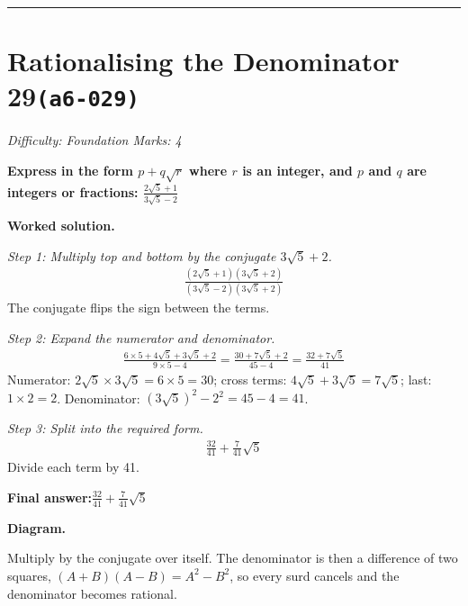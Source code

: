 \documentclass[11pt]{article}
\newcommand{\question}[1]{\par\medskip\noindent\textbf{#1}\par}
\begin{document}
\medskip\hrule

\section*{Rationalising the Denominator 29\quad\small\texttt{(a6-029)}}
\textit{Difficulty: Foundation \quad\textbar\quad Marks: 4}

\question{Express in the form \( p + q\sqrt{r} \) where \( r \) is an integer, and \( p \) and \( q \) are integers or fractions: \( \frac{2\sqrt{5} + 1}{3\sqrt{5} - 2} \)}

\textbf{Worked solution.}

\textit{Step 1: Multiply top and bottom by the conjugate \( 3\sqrt{5} + 2 \).}
\[\begin{gathered}
\frac{(2\sqrt{5} + 1)(3\sqrt{5} + 2)}{(3\sqrt{5} - 2)(3\sqrt{5} + 2)}
\end{gathered}\]
The conjugate flips the sign between the terms.

\textit{Step 2: Expand the numerator and denominator.}
\[\begin{gathered}
\frac{6 \times 5 + 4\sqrt{5} + 3\sqrt{5} + 2}{9 \times 5 - 4} = \frac{30 + 7\sqrt{5} + 2}{45 - 4} = \frac{32 + 7\sqrt{5}}{41}
\end{gathered}\]
Numerator: \( 2\sqrt{5} \times 3\sqrt{5} = 6 \times 5 = 30 \); cross terms: \( 4\sqrt{5} + 3\sqrt{5} = 7\sqrt{5} \); last: \( 1 \times 2 = 2 \). Denominator: \( (3\sqrt{5})^2 - 2^2 = 45 - 4 = 41 \).

\textit{Step 3: Split into the required form.}
\[\begin{gathered}
\frac{32}{41} + \frac{7}{41}\sqrt{5}
\end{gathered}\]
Divide each term by 41.

\begin{answerbox}
\textbf{Final answer:}\quad \(\displaystyle \frac{32}{41} + \frac{7}{41}\sqrt{5}\)
\end{answerbox}
\textbf{Diagram.}

\begin{center}
\end{center}
\small Multiply by the conjugate over itself. The denominator is then a difference of two squares, $(A+B)(A-B)=A^{2}-B^{2}$, so every surd cancels and the denominator becomes rational.\normalsize
\end{document}
